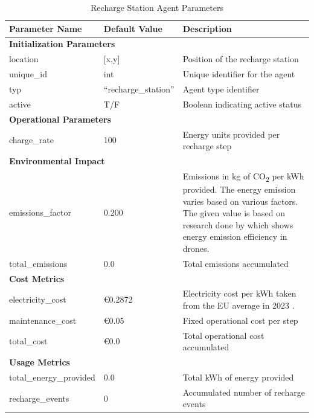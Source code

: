 \documentclass[11pt, a4paper]{article}
\begin{document}
\begin{table}[htbp]
\centering
\caption{Recharge Station Agent Parameters}
\label{tab:recharge_station_parameters}
\small
\begin{tabular}{@{}p{4cm}p{2cm}p{6cm}@{}}
\toprule
\textbf{Parameter Name} & \textbf{Default Value} & \textbf{Description} \\
\midrule
\multicolumn{3}{l}{\textbf{Initialization Parameters}} \\
\midrule
location & [x,y] & Position of the recharge station \\
unique\_id & int & Unique identifier for the agent \\
typ & ``recharge\_station'' & Agent type identifier \\
active & T/F & Boolean indicating active status \\
\midrule
\multicolumn{3}{l}{\textbf{Operational Parameters}} \\
\midrule
charge\_rate & 100 & Energy units provided per recharge step \\
\midrule
\multicolumn{3}{l}{\textbf{Environmental Impact}} \\
\midrule
emissions\_factor & 0.200 & Emissions in kg of CO\textsubscript{2} per kWh provided. The energy emission varies based on various factors. The given value is based on research done by \citet*{stolaroffEnergyUseLife2018} which shows energy emission efficiency in drones. \\
total\_emissions & 0.0 & Total emissions accumulated \\
\midrule
\multicolumn{3}{l}{\textbf{Cost Metrics}} \\
\midrule
electricity\_cost & €0.2872 & Electricity cost per kWh taken from the EU average in 2023 \citep{ElectricityPriceStatistics}. \\
maintenance\_cost & €0.05 & Fixed operational cost per step \\
total\_cost & €0.0 & Total operational cost accumulated \\
\midrule
\multicolumn{3}{l}{\textbf{Usage Metrics}} \\
\midrule
total\_energy\_provided & 0.0 & Total kWh of energy provided \\
recharge\_events & 0 & Accumulated number of recharge events \\
\bottomrule
\end{tabular}
\end{table}
\end{document}
